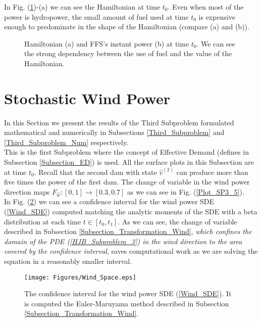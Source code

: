 In Fig. (\ref{Plot_SP2_4})-(a) we can see the Hamiltonian at time $t_0$. Even when most of the power is hydropower, the small amount of fuel used at time $t_0$ is expensive enough to predominate in the shape of the Hamiltonian (compare (a) and (b)).

\begin{figure}[H]
\centering
{}\qquad
{}
\caption{Hamiltonian (a) and FFS's instant power (b) at time $t_0$. We can see the strong dependency between the use of fuel and the value of the Hamiltonian.}
\label{Plot_SP2_4}
\end{figure}

\section{Stochastic Wind Power} \label{Third_Subproblem_Results}

In this Section we present the results of the Third Subproblem formulated mathematical and numerically in Subsections \ref{Third_Subproblem} and \ref{Third_Subproblem_Num} respectively.\\

This is the first Subproblem where the concept of Effective Demand (defines in Subsection \ref{Subsection_ED}) is used. All the surface plots in this Subsection are at time $t_0$. Recall that the second dam with state $\hat{v}^{(2)}$ can produce more than five times the power of the first dam. The change of variable in the wind power direction maps $F_{\hat{w}}:[0,1]\to[0.3,0.7]$ as we can see in Fig. (\ref{Plot_SP3_5}).\\

In Fig. (\ref{Plot_SP3_1}) we can see a confidence interval for the wind power SDE (\ref{Wind_SDE}) computed matching the analytic moments of the SDE with a beta distribution at each time $t\in[t_0,t_1]$. As we can see, the change of variable described in Subsection \ref{Subsection_Transformation_Wind}, \textit{which confines the domain of the PDE (\ref{HJB_Subproblem_3})  in the wind direction to the area covered by the confidence interval}, saves computational work as we are solving the equation in a reasonably smaller interval.\\

\begin{figure}[H]
\centering
\texttt{[image: Figures/Wind\_Space.eps]}
\caption{The confidence interval for the wind power SDE (\ref{Wind_SDE}). It is computed the Euler-Maruyama method described in Subsection \ref{Subsection_Transformation_Wind}.}
\label{Plot_SP3_1}
\end{figure}

